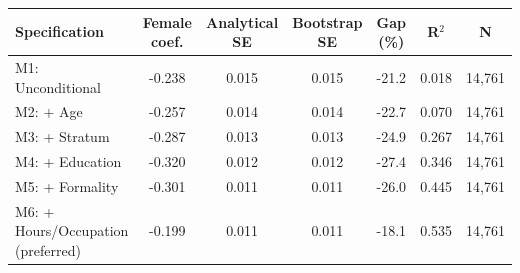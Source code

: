 \begin{tabular}{lcccccc}
\toprule
Specification & Female coef. & Analytical SE & Bootstrap SE & Gap (\%) & R$^2$ & N \\
\midrule
M1: Unconditional & -0.238 & 0.015 & 0.015 & -21.2 & 0.018 & 14,761 \\
M2: + Age & -0.257 & 0.014 & 0.014 & -22.7 & 0.070 & 14,761 \\
M3: + Stratum & -0.287 & 0.013 & 0.013 & -24.9 & 0.267 & 14,761 \\
M4: + Education & -0.320 & 0.012 & 0.012 & -27.4 & 0.346 & 14,761 \\
M5: + Formality & -0.301 & 0.011 & 0.011 & -26.0 & 0.445 & 14,761 \\
M6: + Hours/Occupation (preferred) & -0.199 & 0.011 & 0.011 & -18.1 & 0.535 & 14,761 \\
\bottomrule
\end{tabular}
